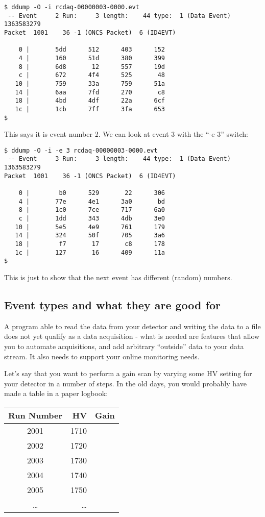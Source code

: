 \documentclass{article}[11pt]
\begin{document}
\begin{verbatim}
$ ddump -O -i rcdaq-00000003-0000.evt
 -- Event     2 Run:     3 length:    44 type:  1 (Data Event)  1363583279
Packet  1001    36 -1 (ONCS Packet)  6 (ID4EVT)

    0 |       5dd      512      403      152 
    4 |       160      51d      380      399 
    8 |       6d8       12      557      19d 
    c |       672      4f4      525       48 
   10 |       759      33a      759      51a 
   14 |       6aa      7fd      270       c8 
   18 |       4bd      4df      22a      6cf 
   1c |       1cb      7ff      3fa      653 
$ 
\end{verbatim}

This says it is event number 2. We can look at event 3 with the ``-e 3'' switch:

\begin{verbatim}
$ ddump -O -i -e 3 rcdaq-00000003-0000.evt
 -- Event     3 Run:     3 length:    44 type:  1 (Data Event)  1363583279
Packet  1001    36 -1 (ONCS Packet)  6 (ID4EVT)

    0 |        b0      529       22      306 
    4 |       77e      4e1      3a0       bd 
    8 |       1c0      7ce      717      6a0 
    c |       1dd      343      4db      3e0 
   10 |       5e5      4e9      761      179 
   14 |       324      50f      705      3a6 
   18 |        f7       17       c8      178 
   1c |       127       16      409      11a 
$ 
\end{verbatim}

This is just to show that the next event has different (random) numbers. 


\subsection{Event types and what they are good for}

A program able to read the data from your detector and writing the data
to a file does not yet qualify as a data acquisition - what is needed
are features that allow you to automate acquisitions, and add
arbitrary ``outside'' data to your data stream. It also needs to
support your online monitoring needs.

Let's say that you want to perform a gain scan by varying some HV
setting for your detector in a number of steps. In the old days, you
would probably have made a table in a paper logbook: 

\begin{center}

\begin{tabular}{|c|r|r|}
\hline
Run Number & HV & Gain \\
\hline
\hline
    2001 & 1710 &  \\ \hline
    2002 & 1720 &  \\ \hline
    2003 & 1730 &  \\ \hline
    2004 & 1740 &  \\ \hline
    2005 & 1750 &  \\ \hline
    \dots & \dots &  \\ \hline
\hline
\end{tabular}
\end{center}
\end{document}
